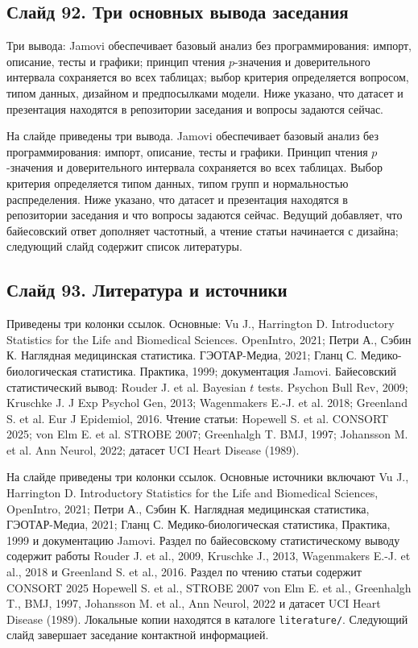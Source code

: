 \documentclass[11pt,a4paper]{article}
\begin{document}
\subsection*{Слайд 92. Три основных вывода заседания}
\begin{onslide}
Три вывода: Jamovi обеспечивает базовый анализ без программирования: импорт, описание, тесты и графики; принцип чтения $p$-значения и доверительного интервала сохраняется во всех таблицах; выбор критерия определяется вопросом, типом данных, дизайном и предпосылками модели. Ниже указано, что датасет и презентация находятся в репозитории заседания и вопросы задаются сейчас.
\end{onslide}
На слайде приведены три вывода. Jamovi обеспечивает базовый анализ без программирования: импорт, описание, тесты и графики. Принцип чтения $p$-значения и доверительного интервала сохраняется во всех таблицах. Выбор критерия определяется типом данных, типом групп и нормальностью распределения. Ниже указано, что датасет и презентация находятся в репозитории заседания и что вопросы задаются сейчас. Ведущий добавляет, что байесовский ответ дополняет частотный, а чтение статьи начинается с дизайна; следующий слайд содержит список литературы.

\subsection*{Слайд 93. Литература и источники}
\begin{onslide}
Приведены три колонки ссылок. Основные: Vu J., Harrington D. Introductory Statistics for the Life and Biomedical Sciences. OpenIntro, 2021; Петри А., Сэбин К. Наглядная медицинская статистика. ГЭОТАР-Медиа, 2021; Гланц С. Медико-биологическая статистика. Практика, 1999; документация Jamovi. Байесовский статистический вывод: Rouder J. et al. Bayesian $t$ tests. Psychon Bull Rev, 2009; Kruschke J. J Exp Psychol Gen, 2013; Wagenmakers E.-J. et al. 2018; Greenland S. et al. Eur J Epidemiol, 2016. Чтение статьи: Hopewell S. et al. CONSORT 2025; von Elm E. et al. STROBE 2007; Greenhalgh T. BMJ, 1997; Johansson M. et al. Ann Neurol, 2022; датасет UCI Heart Disease (1989).
\end{onslide}
На слайде приведены три колонки ссылок. Основные источники включают Vu J., Harrington D. Introductory Statistics for the Life and Biomedical Sciences, OpenIntro, 2021; Петри А., Сэбин К. Наглядная медицинская статистика, ГЭОТАР-Медиа, 2021; Гланц С. Медико-биологическая статистика, Практика, 1999 и документацию Jamovi. Раздел по байесовскому статистическому выводу содержит работы Rouder J. et al., 2009, Kruschke J., 2013, Wagenmakers E.-J. et al., 2018 и Greenland S. et al., 2016. Раздел по чтению статьи содержит CONSORT 2025 Hopewell S. et al., STROBE 2007 von Elm E. et al., Greenhalgh T., BMJ, 1997, Johansson M. et al., Ann Neurol, 2022 и датасет UCI Heart Disease (1989). Локальные копии находятся в каталоге \texttt{literature/}. Следующий слайд завершает заседание контактной информацией.
\end{document}
